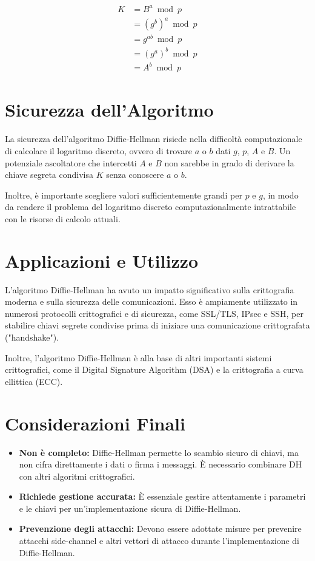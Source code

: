 \documentclass[a4paper,12pt]{report}
\begin{document}
\begin{align*}
K &= B^a \bmod p \\
  &= (g^b)^a \bmod p \\
  &= g^{ab} \bmod p \\
  &= (g^a)^b \bmod p \\
  &= A^b \bmod p
\end{align*}

\section{Sicurezza dell'Algoritmo}
La sicurezza dell'algoritmo Diffie-Hellman risiede nella difficoltà computazionale di calcolare il logaritmo discreto, ovvero di trovare $a$ o $b$ dati $g$, $p$, $A$ e $B$. Un potenziale ascoltatore che intercetti $A$ e $B$ non sarebbe in grado di derivare la chiave segreta condivisa $K$ senza conoscere $a$ o $b$.

Inoltre, è importante scegliere valori sufficientemente grandi per $p$ e $g$, in modo da rendere il problema del logaritmo discreto computazionalmente intrattabile con le risorse di calcolo attuali.

\section{Applicazioni e Utilizzo}
L'algoritmo Diffie-Hellman ha avuto un impatto significativo sulla crittografia moderna e sulla sicurezza delle comunicazioni. Esso è ampiamente utilizzato in numerosi protocolli crittografici e di sicurezza, come SSL/TLS, IPsec e SSH, per stabilire chiavi segrete condivise prima di iniziare una comunicazione crittografata ("handshake").

Inoltre, l'algoritmo Diffie-Hellman è alla base di altri importanti sistemi crittografici, come il Digital Signature Algorithm (DSA) e la crittografia a curva ellittica (ECC).

\section{Considerazioni Finali}
\begin{itemize}
    \item \textbf{Non è completo:} Diffie-Hellman permette lo scambio sicuro di chiavi, ma non cifra direttamente i dati o firma i messaggi. È necessario combinare DH con altri algoritmi crittografici.
    
    \item \textbf{Richiede gestione accurata:} È essenziale gestire attentamente i parametri e le chiavi per un'implementazione sicura di Diffie-Hellman.
    
    \item \textbf{Prevenzione degli attacchi:} Devono essere adottate misure per prevenire attacchi side-channel e altri vettori di attacco durante l'implementazione di Diffie-Hellman.
\end{itemize}
\end{document}
